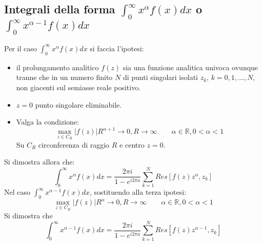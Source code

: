 \documentclass[twoside]{article}
\begin{document}
\subsection{Integrali della forma \texorpdfstring{$\int_0^\infty x^\alpha f(x)dx$}{Lg} o \texorpdfstring{$\int_0^\infty x^{\alpha-1} f(x)dx$}{Lg}}
Per il caso $\int_0^\infty x^\alpha f(x)dx$ si faccia l'ipotesi:
\begin{itemize}
    \item il prolungamento analitico $f(z)$ sia una funzione analitica univoca ovunque tranne che in un numero finito $N$ di punti singolari isolati $z_k$, $k=0,1,...,N$, non giacenti sul semiasse reale positivo.
    \item $z=0$ punto singolare eliminabile.
    \item Valga la condizione:
    \begin{equation}
        \max_{z\in C_R}|f(z)|R^{\alpha+1} \to 0, R\to\infty\qquad \alpha\in\mathds{R}, 0<\alpha<1
    \end{equation}
    Su $C_R$ circonferenza di raggio $R$ e centro $z=0$.
\end{itemize}
Si dimostra allora che:
\begin{equation} \label{13 alpha}
    \int_0^\infty x^\alpha f(x)dx=\frac{2\pi i}{1-e^{i2\pi a}} \sum_{k=1}^{N}Res[f(z)z^\alpha,z_k]
\end{equation}
Nel caso $\int_0^\infty x^{\alpha-1} f(x)dx$, sostituendo alla terza ipotesi:
\begin{equation}
     \max_{z\in C_R}|f(z)|R^{\alpha} \to 0, R\to\infty\qquad \alpha\in\mathds{R}, 0<\alpha<1
\end{equation}
Si dimostra che
\begin{equation} \label{13 alpha-1}
    \int_0^\infty x^{\alpha-1} f(x)dx=\frac{2\pi i}{1-e^{i2\pi a}} \sum_{k=1}^{N}Res[f(z)z^{\alpha-1},z_k]
\end{equation}
\end{document}
